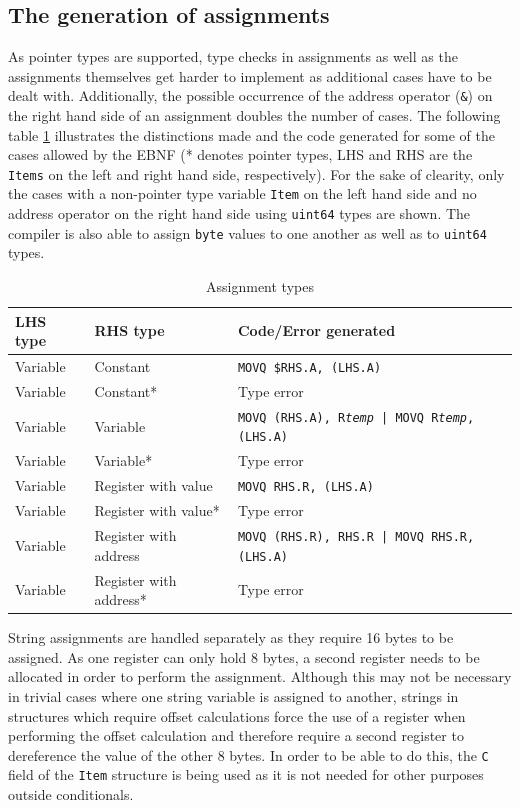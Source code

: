 \documentclass[a4paper]{scrartcl}
\let\section\subsection
\let\subsection\subsubsection
\let\subsubsection\paragraph
\let\paragraph\subparagraph
\let\subparagraph\undefined
\begin{document}
    \section{The generation of assignments}
      As pointer types are supported, type checks in assignments as well as the assignments themselves get harder to implement as additional cases have to be dealt with. Additionally, the possible occurrence of the address operator (\texttt{\&}) on the right hand side of an assignment doubles the number of cases. The following table \ref{tbl:assigntypes} illustrates the distinctions made and the code generated for some of the cases allowed by the EBNF (* denotes pointer types, LHS and RHS are the \texttt{Items} on the left and right hand side, respectively). For the sake of clearity, only the cases with a non-pointer type variable \texttt{Item} on the left hand side and no address operator on the right hand side using \texttt{uint64} types are shown. The compiler is also able to assign \texttt{byte} values to one another as well as to \texttt{uint64} types.

      \begin{table}[htb]
      \begin{tabular}{lll}
        \toprule
        \textbf{LHS type} & \textbf{RHS type} & \textbf{Code/Error generated}\\
        \midrule
        Variable & Constant & \texttt{MOVQ \$RHS.A, (LHS.A)}\\
        Variable & Constant* & Type error\\
        Variable & Variable & \texttt{MOVQ (RHS.A), R\textit{temp} | MOVQ R\textit{temp}, (LHS.A)}\\
        Variable & Variable* & Type error\\
        Variable & Register with value & \texttt{MOVQ RHS.R, (LHS.A)}\\
        Variable & Register with value* & Type error\\
        Variable & Register with address & \texttt{MOVQ (RHS.R), RHS.R | MOVQ RHS.R, (LHS.A)}\\
        Variable & Register with address* & Type error\\
        \bottomrule
      \end{tabular}
      \caption{Assignment types}
      \label{tbl:assigntypes}
      \end{table}
      
      String assignments are handled separately as they require 16 bytes to be assigned. As one register can only hold 8 bytes, a second register needs to be allocated in order to perform the assignment. Although this may not be necessary in trivial cases where one string variable is assigned to another, strings in structures which require offset calculations force the use of a register when performing the offset calculation and therefore require a second register to dereference the value of the other 8 bytes. In order to be able to do this, the \texttt{C} field of the \texttt{Item} structure is being used as it is not needed for other purposes outside conditionals.
\end{document}
